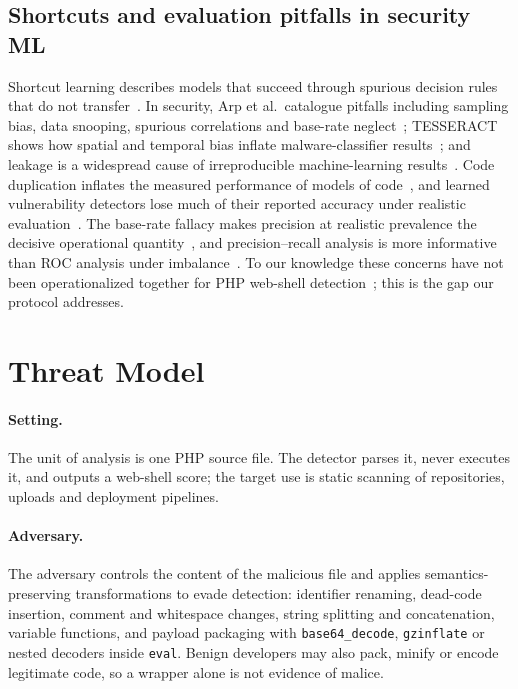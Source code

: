 \documentclass[pdflatex,sn-mathphys-num]{sn-jnl}
\begin{document}
\subsection{Shortcuts and evaluation pitfalls in security ML}
Shortcut learning describes models that succeed through spurious decision
rules that do not transfer~\cite{geirhos2020shortcut}. In security, Arp et al.\
catalogue pitfalls including sampling bias, data snooping, spurious
correlations and base-rate neglect~\cite{arp2022dos}; TESSERACT shows how
spatial and temporal bias inflate malware-classifier
results~\cite{pendlebury2019tesseract}; and leakage is a widespread cause of
irreproducible machine-learning results~\cite{kapoor2023leakage}. Code
duplication inflates the measured performance of models of
code~\cite{allamanis2019duplication}, and learned vulnerability detectors lose
much of their reported accuracy under realistic
evaluation~\cite{chakraborty2022deep,risse2024limits}. The base-rate fallacy
makes precision at realistic prevalence the decisive operational
quantity~\cite{axelsson2000base}, and precision--recall analysis is more
informative than ROC analysis under imbalance~\cite{saito2015prc}. To our
knowledge these concerns have not been operationalized together for PHP
web-shell detection~\cite{hannousse2022webshell,zeng2025webshell,mahmoud2025ransomware};
this is the gap our protocol addresses.

\section{Threat Model}\label{sec:threat}
\paragraph{Setting.} The unit of analysis is one PHP source file. The detector
parses it, never executes it, and outputs a web-shell score; the target use is
static scanning of repositories, uploads and deployment pipelines.

\paragraph{Adversary.} The adversary controls the content of the malicious
file and applies semantics-preserving transformations to evade detection:
identifier renaming, dead-code insertion, comment and whitespace changes,
string splitting and concatenation, variable functions, and payload packaging
with \texttt{base64\_decode}, \texttt{gzinflate} or nested decoders inside
\texttt{eval}. Benign developers may also pack, minify or encode legitimate
code, so a wrapper alone is not evidence of malice.
\end{document}
